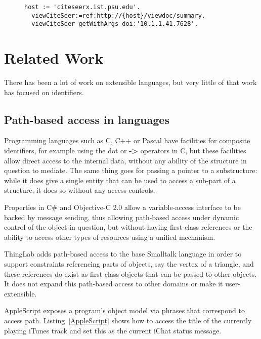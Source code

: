 \documentclass[preprint,authoryear]{acm_proc_article-sp}
\begin{document}
\begin{figure}[htbp]
\begin{lstlisting}[style=L,label=url-args,caption=URL arguments via reference and higher order message.]
  host := 'citeseerx.ist.psu.edu'.
  viewCiteSeer:=ref:http://{host}/viewdoc/summary.
  viewCiteSeer getWithArgs doi:'10.1.1.41.7628'.
\end{lstlisting}
\end{figure}


\section{Related Work}
\label{related-work}

There has been a lot of work on extensible languages, but very little of that work 
has focused on identifiers.  

\subsection{Path-based access in languages}

Programming languages such as C, C++ or Pascal have facilities for composite
identifiers, for example using the dot or {\bf -> } operators in C, but these facilities allow
direct access to the internal data, without any ability of the structure in question to 
mediate.  The same thing goes for passing a pointer to a substructure:  while it
does give a single entity that can be used to access a sub-part of a structure, it
does so without any access controls.

Properties in C\# and Objective-C 2.0 allow a variable-access interface to be backed by 
message sending, thus allowing path-based access under dynamic control of the object
in question, but without having first-class references or the ability to access other
types of resources using a unified mechanism.

ThingLab\cite{thinglab}  adds path-based access to the base Smalltalk language in order to support
constraints referencing parts of objects, say the vertex of a triangle, and these
references do exist as first class objects that can be passed to other objects.
   It does not
expand this path-based access to other domains or make it user-extensible.

AppleScript\cite{applescript-hopl3} exposes a program's object model via
phrases that correspond to access path.  Listing~\ref{AppleScript} shows 
how to access the title of the currently playing iTunes track and set this
as the current iChat status message.
\end{document}
